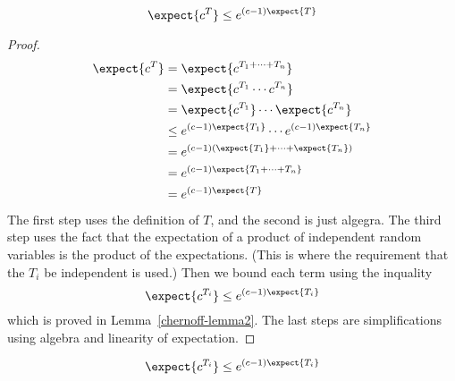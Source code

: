 \begin{lemma}
\label{chernoff-lemma1}
\[
\expect{c^T} \leq e^{(c-1) \expect{T}}
\]
\end{lemma}

\begin{proof}
\begin{align*}
    \expect{c^T} & = \expect{c^{T_1 + \cdots + T_n}} \\
            & = \expect{c^{T_1} \cdots c^{T_n}} \\
            & = \expect{c^{T_1}}  \cdots \expect{c^{T_n}} \\
            & \leq e^{(c-1) \expect{T_1}} \cdots  e^{(c-1) \expect{T_n}} \\
            & = e^{(c-1) (\expect{T_1} + \cdots + \expect{T_n})} \\
            & = e^{(c-1) \expect{T_1 + \cdots + T_n}} \\
            & = e^{(c-1) \expect{T}}
\end{align*}
The first step uses the definition of $T$, and the second is just
algegra.  The third step uses the fact that the expectation of a
product of independent random variables is the product of the
expectations.  (This is where the requirement that the $T_i$ be
independent is used.)  Then we bound each term using the inquality
\[
    \expect{c^{T_i}} \leq e^{(c - 1) \expect{T_i}}
\]
which is proved in Lemma~\ref{chernoff-lemma2}.  The last steps are
simplifications using algebra and linearity of expectation.
\end{proof}

\begin{lemma}
\label{chernoff-lemma2}
\[
\expect{c^{T_i}} \leq e^{(c - 1) \expect{T_i}}
\]
\end{lemma}

